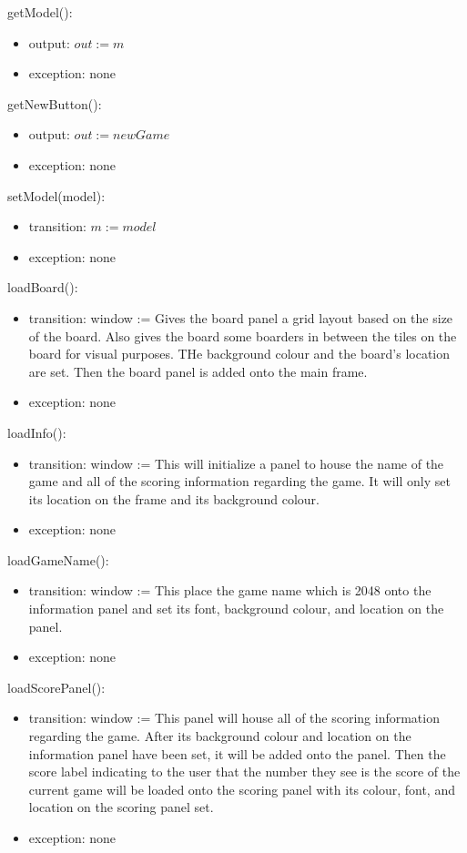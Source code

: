 \documentclass[12pt]{article}
\begin{document}
\noindent getModel():
\begin{itemize}
\item output: $out := m$
\item exception: none
\end{itemize}

\noindent getNewButton():
\begin{itemize}
\item output: $out := newGame$
\item exception: none
\end{itemize}

\noindent setModel(model):
\begin{itemize} 
\item transition: $m := model$
\item exception: none
\end{itemize}

\noindent loadBoard():
\begin{itemize}
\item transition: window := Gives the board panel a grid layout based on the size of the board. Also gives the board some boarders in between the tiles on the board for visual purposes. THe background colour and the board's location are set. Then the board panel is added onto the main frame. 
\item exception: none
\end{itemize}

\noindent loadInfo():
\begin{itemize}
\item transition: window := This will initialize a panel to house the name of the game and all of the scoring information regarding the game. It will only set its location on the frame and its background colour.
\item exception: none
\end{itemize}

\noindent loadGameName():
\begin{itemize}
\item transition: window := This place the game name which is 2048 onto the information panel and set its font, background colour, and location on the panel.
\item exception: none
\end{itemize}

\noindent loadScorePanel():
\begin{itemize}
\item transition: window := This panel will house all of the scoring information regarding the game. After its background colour and location on the information panel have been set, it will be added onto the panel. Then the score label indicating to the user that the number they see is the score of the current game will be loaded onto the scoring panel with its colour, font, and location on the scoring panel set.
\item exception: none
\end{itemize}
\end{document}
